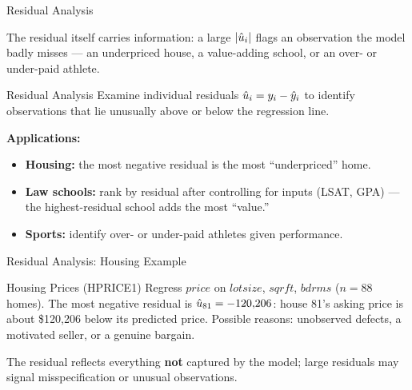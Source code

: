\documentclass[aspectratio=169, 12pt]{beamer}
\begin{document}
\begin{frame}{Residual Analysis}

  The residual itself carries information: a large $|\hat{u}_i|$ flags an observation the
  model badly misses --- an underpriced house, a value-adding school, or an over- or
  under-paid athlete.

  \begin{definitionbox}{Residual Analysis}
    Examine individual residuals $\hat{u}_i = y_i - \hat{y}_i$ to identify observations that lie
    unusually above or below the regression line.
  \end{definitionbox}

  \medskip

  \textbf{Applications:}
  \begin{itemize}
    \item \textbf{Housing:} the most negative residual is the most ``underpriced'' home.
    \item \textbf{Law schools:} rank by residual after controlling for inputs (LSAT,
      GPA) --- the highest-residual school adds the most ``value.''
    \item \textbf{Sports:} identify over- or under-paid athletes given performance.
  \end{itemize}

\end{frame}

\begin{frame}{Residual Analysis: Housing Example}

  \begin{examplebox}{Housing Prices (HPRICE1)}
    Regress $price$ on $lotsize$, $sqrft$, $bdrms$ ($n = 88$ homes). The most negative
    residual is $\hat{u}_{81} = -120{,}206$: house 81's asking price is about \$120{,}206
    below its predicted price. Possible reasons: unobserved defects, a motivated seller,
    or a genuine bargain.
  \end{examplebox}

  \medskip

  \begin{keybox}
    The residual reflects everything \textbf{not} captured by the model; large residuals
    may signal misspecification or unusual observations.
  \end{keybox}

\end{frame}
\end{document}
